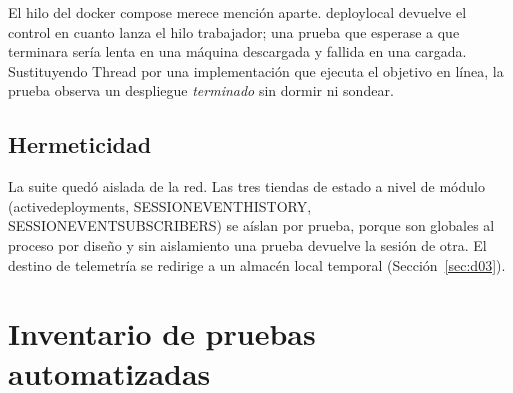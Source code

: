 \documentclass[11pt,a4paper]{article}
\newcommand{\code}[1]{{\ttfamily\small\def\_{\textunderscore\allowbreak}#1}}
\begin{document}
\noindent
El hilo del \code{docker compose} merece mención aparte. \code{deploy\_local} devuelve el
control en cuanto lanza el hilo trabajador; una prueba que esperase a que terminara sería
lenta en una máquina descargada y fallida en una cargada. Sustituyendo \code{Thread} por una
implementación que ejecuta el objetivo en línea, la prueba observa un despliegue
\emph{terminado} sin dormir ni sondear.

\subsection{Hermeticidad}

La suite quedó aislada de la red. Las tres tiendas de estado a nivel de módulo
(\code{\_active\_deployments}, \code{SESSION\_EVENT\_HISTORY}, \code{SESSION\_EVENT\_SUBSCRIBERS})
se aíslan por prueba, porque son globales al proceso por diseño y sin aislamiento una prueba
devuelve la sesión de otra. El destino de telemetría se redirige a un almacén local temporal
(Sección~\ref{sec:d03}).

\section{Inventario de pruebas automatizadas}
\label{sec:inventario}
\end{document}
